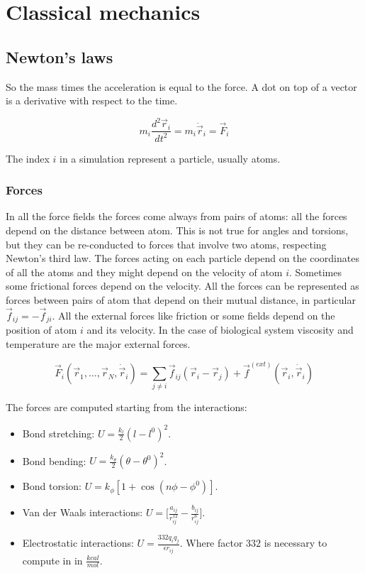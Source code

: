 \chapter{Classical mechanics}

\section{Newton's laws}
So the mass times the acceleration is equal to the force.
A dot on top of a vector is a derivative with respect to the time.

$$m_i\frac{d^2 \vec{r}_i}{dt^2} = m_i\ddot{\vec{r}}_i = \vec{F}_i$$

The index $i$ in a simulation represent a particle, usually atoms.

	\subsection{Forces}
	In all the force fields the forces come always from pairs of atoms: all the forces depend on the distance between atom.
	This is not true for angles and torsions, but they can be re-conducted to forces that involve two atoms, respecting Newton's third law.
	The forces acting on each particle depend on the coordinates of all the atoms and they might depend on the velocity of atom $i$.
	Sometimes some frictional forces depend on the velocity.
	All the forces can be represented as forces between pairs of atom that depend on their mutual distance, in particular $\vec{f}_{ij} = -\vec{f}_{ji}$.
	All the external forces like friction or some fields depend on the position of atom $i$ and its velocity.
	In the case of biological system viscosity and temperature are the major external forces.

	$$\vec{F}_i(\vec{r}_1, \dots, \vec{r}_N, \dot{\vec{r}}_i) = \sum\limits_{j\neq i}\vec{f}_{ij}(\vec{r}_i-\vec{r}_j)+\vec{f}^{(ext)}(\vec{r}_i, \dot{\vec{r}}_i)$$

	The forces are computed starting from the interactions:

	\begin{itemize}
		\item Bond stretching: $U = \frac{k_l}{2}(l-l^0)^2$.
		\item Bond bending: $U = \frac{k_\theta}{2}(\theta-\theta^0)^2$.
		\item Bond torsion: $U = k_\phi[1+\cos(n\phi-\phi^0)]$.
		\item Van der Waals interactions: $U = \biggl[\frac{a_{ij}}{r_{ij}^{12}}-\frac{b_{ij}}{r_{ij}^6}\biggr]$.
		\item Electrostatic interactions: $U = \frac{332q_iq_j}{\epsilon r_{ij}}$.
			Where factor $332$ is necessary to compute in in $\frac{kcal}{mol}$.
	\end{itemize}

